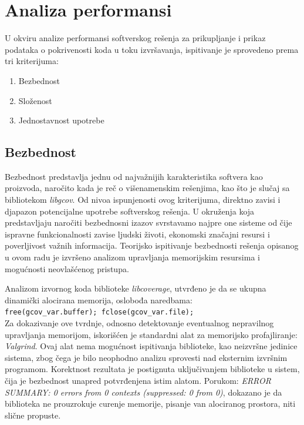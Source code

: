 \documentclass[12pt,oneside]{memoir}
\newcommand{\kod}[1]{\texttt{#1}}
\newcommand{\strano}[1]{\textit{#1}}
\begin{document}
\section{Analiza performansi}

U okviru analize performansi softverskog rešenja za prikupljanje i prikaz podataka o pokrivenosti koda u toku izvršavanja, ispitivanje je sprovedeno prema tri kriterijuma:
\begin{enumerate}
\item Bezbednost
\item Složenost
\item Jednostavnost upotrebe
\end{enumerate}

\subsection{Bezbednost}

Bezbednost predstavlja jednu od najvažnijih karakteristika softvera kao proizvoda, naročito kada je reč o višenamenskim rešenjima, kao što je slučaj sa bibliotekom \strano{libgcov}. Od nivoa ispunjenosti ovog kriterijuma, direktno zavisi i djapazon potencijalne upotrebe softverskog rešenja. U okruženja koja predstavljaju naročiti bezbednosni izazov svrstavamo najpre one sisteme od čije ispravne funkcionalnosti zavise ljudski životi, ekonomski značajni resursi i poverljivost važnih informacija. Teorijsko ispitivanje bezbednosti rešenja opisanog u ovom radu je izvršeno analizom upravljanja memorijskim resursima i mogućnosti neovlašćenog pristupa. 

Analizom izvornog koda biblioteke \strano{libcoverage}, utvrđeno je da se ukupna dinamički alocirana memorija, oslobođa naredbama:\\ \kod{free(gcov\_var.buffer); fclose(gcov\_var.file);} \\
Za dokazivanje ove tvrdnje, odnosno detektovanje eventualnog nepravilnog upravljanja memorijom, iskorišćen je standardni alat za memorijsko profajliranje: \strano{Valgrind}. Ovaj alat nema mogućnost ispitivanja biblioteke, kao neizvršne jedinice sistema, zbog čega je bilo neophodno analizu sprovesti nad eksternim izvršnim programom. Korektnost rezultata je postignuta uključivanjem biblioteke u sistem, čija je bezbednost unapred potvrđenjena istim alatom. Porukom: \strano{ERROR SUMMARY: 0 errors from 0 contexts (suppressed: 0 from 0)}, dokazano je da biblioteka ne prouzrokuje curenje memorije, pisanje van alociranog prostora, niti slične propuste. 
\end{document}
